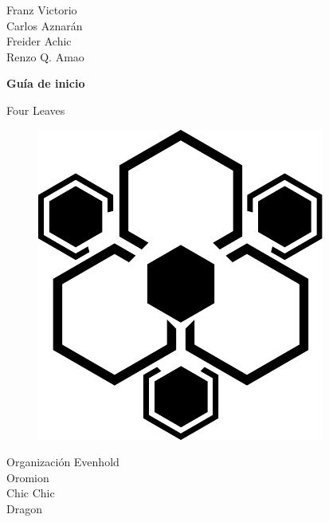 \begin{titlepage}
	\raggedleft 						%
	\vspace*{\baselineskip}	%

	{\Large
		Franz Victorio	\\
		Carlos Aznarán	\\
		Freider Achic		\\
		Renzo Q. Amao		\\
	}\vspace*{0.167\textheight}

	\bfseries{\LARGE Guía de inicio }\\[\baselineskip]

	{\Huge Four Leaves
		\begin{figure}[h]\hfill\includegraphics[width=0.2\paperwidth]{./img/fourleaves}\end{figure}}%

	\large Organización	\vfill	Evenhold\\Oromion\\Chic Chic\\Dragon

	\vspace{3\baselineskip} %

\end{titlepage}